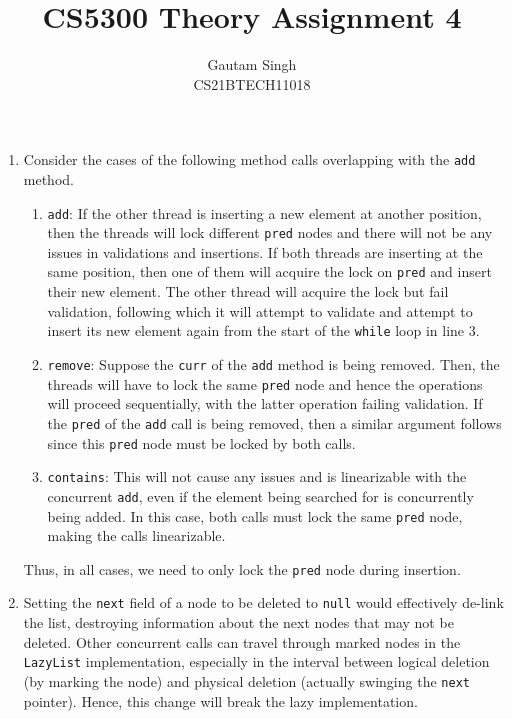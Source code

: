 \documentclass[conference,compsoc,twocolumn]{IEEEtran}
\begin{document}
\vspace{3cm}
\title{CS5300 Theory Assignment 4}
\author{Gautam Singh\\CS21BTECH11018}
\maketitle

\bigskip

\begin{enumerate}
    \item Consider the cases of the following method calls overlapping with the
    \texttt{add} method.
    \begin{enumerate}
        \item \texttt{add}: If the other thread is inserting a new element at
        another position, then the threads will lock different \texttt{pred}
        nodes and there will not be any issues in validations and insertions. If
        both threads are inserting at the same position, then one of them will
        acquire the lock on \texttt{pred} and insert their new element. The
        other thread will acquire the lock but fail validation, following which
        it will attempt to validate and attempt to insert its new element again
        from the start of the \texttt{while} loop in line 3.

        \item \texttt{remove}: Suppose the \texttt{curr} of the \texttt{add}
        method is being removed. Then, the threads will have to lock the same
        \texttt{pred} node and hence the operations will proceed sequentially,
        with the latter operation failing validation. If the \texttt{pred} of
        the \texttt{add} call is being removed, then a similar argument follows
        since this \texttt{pred} node must be locked by both calls.

        \item \texttt{contains}: This will not cause any issues and is
        linearizable with the concurrent \texttt{add}, even if the element being
        searched for is concurrently being added. In this case, both calls must
        lock the same \texttt{pred} node, making the calls linearizable.
    \end{enumerate}

    Thus, in all cases, we need to only lock the \texttt{pred} node during
    insertion.

    \item Setting the \texttt{next} field of a node to be deleted to
    \texttt{null} would effectively de-link the list, destroying information
    about the next nodes that may not be deleted. Other concurrent calls can
    travel through marked nodes in the \texttt{LazyList} implementation,
    especially in the interval between logical deletion (by marking the node)
    and physical deletion (actually swinging the \texttt{next} pointer). Hence,
    this change will break the lazy implementation.


\end{enumerate}
\end{document}
